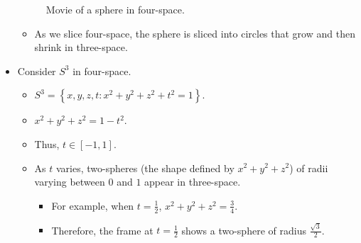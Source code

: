 \documentclass[titlepage]{article}
\numberwithin{figure}{section}
\numberwithin{table}{section}
\numberwithin{equation}{section}
\begin{document}
\begin{itemize}
\begin{figure}[h!]
        \caption{Movie of a sphere in four-space.}
        \label{fig:movie-sphere4}
    \end{figure}
    \begin{itemize}
        \item As we slice four-space, the sphere is sliced into circles that grow and then shrink in three-space.
    \end{itemize}
    \item Consider $S^3$ in four-space.
    \begin{itemize}
        \item $S^3 = \left\{ x,y,z,t:x^2+y^2+z^2+t^2=1\right\}$.
        \item $x^2+y^2+z^2=1-t^2$.
        \item Thus, $t\in[-1,1]$.
        \item As $t$ varies, two-spheres (the shape defined by $x^2+y^2+z^2$) of radii varying between $0$ and $1$ appear in three-space.
        \begin{itemize}
            \item For example, when $t=\frac{1}{2}$, $x^2+y^2+z^2=\frac{3}{4}$.
            \item Therefore, the frame at $t=\frac{1}{2}$ shows a two-sphere of radius $\frac{\sqrt{3}}{2}$.

\end{itemize}
\end{itemize}
\end{itemize}
\end{document}
